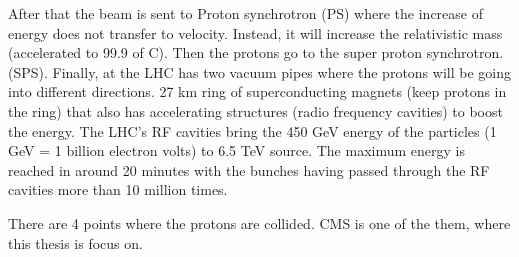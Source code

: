 After that the beam is sent to Proton synchrotron (PS) where the increase of energy does not transfer to velocity.
Instead, it will increase the relativistic mass (accelerated to 99.9 of C).
Then the protons go to the super proton synchrotron. (SPS). Finally, at the LHC has two vacuum pipes where the protons will be going into different directions. 27 km ring of superconducting magnets (keep protons in the ring) that also has accelerating structures (radio frequency cavities) to boost the energy. The LHC’s RF cavities bring the 450 GeV energy of the particles (1 GeV = 1 billion electron volts) to 6.5 TeV source.
The maximum energy is reached in around 20 minutes with the bunches having passed through the RF cavities more than 10 million times.

There are 4 points where the protons are collided. CMS is one of the them, where this thesis is focus on.


